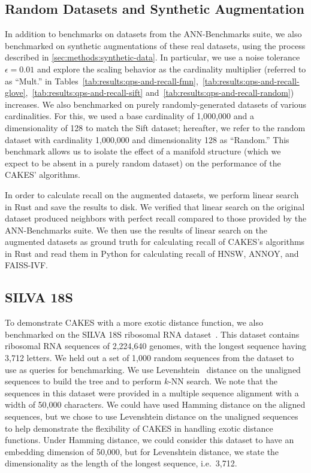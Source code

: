 \subsection{Random Datasets and Synthetic Augmentation}
\label{sec:datasets-and-benchmarks:random-datasets}

In addition to benchmarks on datasets from the ANN-Benchmarks suite, we also benchmarked on synthetic augmentations of these real datasets, using the process described in \ref{sec:methods:synthetic-data}.
In particular, we use a noise tolerance $\epsilon = 0.01$ and explore the scaling behavior as the cardinality multiplier (referred to as ``Mult.'' in Tables~\ref{tab:results:qps-and-recall-fmn},~\ref{tab:results:qps-and-recall-glove},~\ref{tab:results:qps-and-recall-sift} and~\ref{tab:results:qps-and-recall-random}) increases.
We also benchmarked on purely randomly-generated datasets of various cardinalities.
For this, we used a base cardinality of 1,000,000 and a dimensionality of 128 to match the Sift dataset; hereafter, we refer to the random dataset with cardinality 1,000,000 and dimensionality 128 as ``Random.''
This benchmark allows us to isolate the effect of a manifold structure (which we expect to be absent in a purely random dataset) on the performance of the CAKES' algorithms.

In order to calculate recall on the augmented datasets, we perform linear search in Rust and save the results to disk.
We verified that linear search on the original dataset produced neighbors with perfect recall compared to those provided by the ANN-Benchmarks suite.
We then use the results of linear search on the augmented datasets as ground truth for calculating recall of CAKES's algorithms in Rust and read them in Python for calculating recall of HNSW, ANNOY, and FAISS-IVF.


\subsection{SILVA 18S}
\label{sec:datasets-and-benchmarks:silva-18s}

To demonstrate CAKES with a more exotic distance function, we also benchmarked on the SILVA 18S ribosomal RNA dataset~\cite{10.1093/nar/gks1219}.
This dataset contains ribosomal RNA sequences of 2,224,640 genomes, with the longest sequence having 3,712 letters.
We held out a set of 1,000 random sequences from the dataset to use as queries for benchmarking.
We use Levenshtein~\cite{levenshtein1966binary} distance on the unaligned sequences to build the tree and to perform $k$-NN search.
We note that the sequences in this dataset were provided in a multiple sequence alignment with a width of 50,000 characters.
We could have used Hamming distance on the aligned sequences, but we chose to use Levenshtein distance on the unaligned sequences to help demonstrate the flexibility of CAKES in handling exotic distance functions.
Under Hamming distance, we could consider this dataset to have an embedding dimension of 50,000, but for Levenshtein distance, we state the dimensionality as the length of the longest sequence, i.e.\, 3,712.


